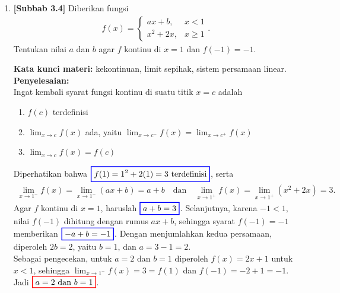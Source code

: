 \documentclass[10pt,openany,a4paper]{article}
\theoremstyle{definition}
\theoremstyle{definition}
\theoremstyle{plain}
\newenvironment{jawab}[2][tes]{%
\par\noindent\textbf{Kata kunci materi:} #1.\\
\textbf{Penyelesaian:} #2%
}{}
\begin{document}
\begin{enumerate}
    \item \textbf{[Subbab 3.4]} Diberikan fungsi
    \begin{align*}
        f(x)=\begin{cases}
            ax+b, & x<1\\
            x^2+2x, & x\geq 1
        \end{cases}.
    \end{align*}
    Tentukan nilai $a$ dan $b$ agar $f$ kontinu di $x=1$ dan $f(-1)=-1$.
    \begin{jawab}[kekontinuan, limit sepihak, sistem persamaan linear]{~\\
        Ingat kembali syarat fungsi kontinu di suatu titik \(x = c\) adalah
        \begin{enumerate}
            \item \(f(c)\) terdefinisi
            \item \(\displaystyle \lim_{x \to c} f(x)\) ada, yaitu $\displaystyle \lim_{x \to c^-} f(x) = \lim_{x \to c^+} f(x)$
            \item \(\displaystyle\lim_{x \to c} f(x) = f(c)\)
        \end{enumerate}
        Diperhatikan bahwa $\colorlet{oldcolor}{.}
        \color{blue}
        \setlength{\fboxrule}{1pt} \boxed{\color{oldcolor}f(1)=1^2+2(1)=3~\text{terdefinisi}}\color{oldcolor}$, serta
        \begin{align*}
            \lim_{x\to 1^-}f(x)=\lim_{x\to 1^-}(ax+b)=a+b \quad\text{dan}\quad \lim_{x\to 1^+}f(x)=\lim_{x\to 1^+}(x^2+2x)=3.
        \end{align*}
        Agar $f$ kontinu di $x=1$, haruslah $\colorlet{oldcolor}{.}
        \color{blue}
        \setlength{\fboxrule}{1pt} \boxed{\color{oldcolor}a+b=3}\color{oldcolor}$. Selanjutnya, karena $-1<1$, nilai $f(-1)$ dihitung dengan rumus $ax+b$, sehingga syarat $f(-1)=-1$ memberikan $\colorlet{oldcolor}{.}
        \color{blue}
        \setlength{\fboxrule}{1pt} \boxed{\color{oldcolor}-a+b=-1}\color{oldcolor}$. Dengan menjumlahkan kedua persamaan, diperoleh $2b=2$, yaitu $b=1$, dan $a=3-1=2$.\\
        Sebagai pengecekan, untuk $a=2$ dan $b=1$ diperoleh $f(x)=2x+1$ untuk $x<1$, sehingga $\displaystyle\lim_{x\to 1^-}f(x)=3=f(1)$ dan $f(-1)=-2+1=-1$. Jadi $\colorlet{oldcolor}{.}
        \color{red}
        \setlength{\fboxrule}{1pt} \boxed{\color{oldcolor}a=2 \text{ dan } b=1}\color{oldcolor}$.
    }
    \end{jawab}


\end{enumerate}
\end{document}
